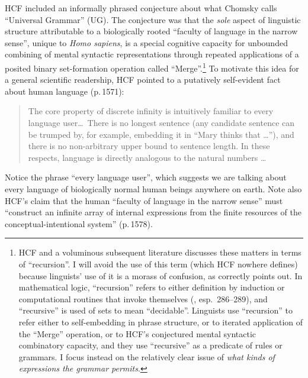 \documentclass[output=paper,colorlinks,citecolor=brown
]{langscibook}
\begin{document}
HCF included an informally phrased conjecture about what Chomsky calls
``Universal Grammar'' (UG). The conjecture was that the \emph{sole}
aspect of linguistic structure attributable to a biologically rooted
``faculty of language in the narrow sense'', unique to \textit{Homo sapiens},
is a special cognitive capacity for unbounded combining of mental
syntactic representations through repeated applications of a posited
binary set-formation operation called ``Merge''.\footnote{%
   HCF and a voluminous subsequent literature discusses these matters
   in terms of ``recursion''. I will avoid the use of this term (which
   HCF nowhere defines) because linguists' use of it is a morass of
   confusion, as \citet{Lobina14} correctly points out. In mathematical
   logic, ``recursion'' refers to either definition by induction or
   computational routines that invoke themselves (\citealt{Soare96},
   esp.\ 286--289), and ``recursive'' is used of sets to mean ``decidable''.
   Linguists use ``recursion'' to refer either to self-embedding in
   phrase structure, or to iterated application of the ``Merge''
   operation, or to HCF's conjectured mental syntactic combinatory
   capacity, and they use ``recursive'' as a predicate of rules or
   grammars. I focus instead on the relatively clear issue of
   \emph{what kinds of expressions the grammar permits}.}
To motivate this idea for a general scientific readership, HCF pointed
to a putatively self-evident fact about human language (p.\,1571):

\begin{quote}
The core property of discrete infinity is intuitively familiar to every
language user\ldots\ There is no longest sentence (any candidate sentence
can be trumped by, for example, embedding it in ``Mary thinks that \ldots''),
and there is no non-arbitrary upper bound to sentence length. In these
respects, language is directly analogous to the natural numbers \ldots
\end{quote}
Notice the phrase ``every language user'', which suggests we are talking
about every language of biologically normal human beings anywhere on
earth. Note also HCF's claim that the human ``faculty of language in the
narrow sense'' must ``construct an infinite array of internal expressions
from the finite resources of the conceptual-intentional system'' (p.\,1578).
\end{document}

